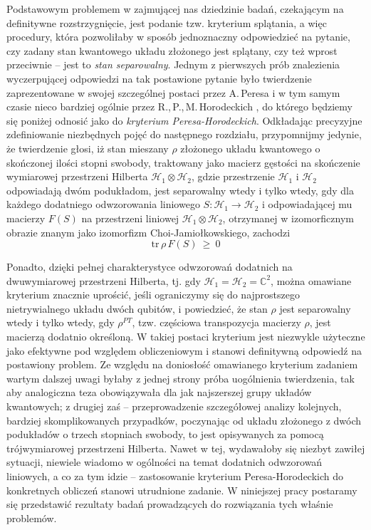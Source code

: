 Podstawowym problemem w zajmującej nas dziedzinie badań,
czekającym na definitywne rozstrzygnięcie,
jest podanie tzw. kryterium splątania,
a więc procedury,
która pozwoliłaby w sposób jednoznaczny odpowiedzieć na pytanie,
czy zadany stan kwantowego układu złożonego jest splątany,
czy też wprost przeciwnie -- jest to 
 \emph{stan separowalny}.
Jednym z pierwszych prób znalezienia wyczerpującej odpowiedzi na tak postawione
pytanie było twierdzenie zaprezentowane w swojej szczególnej postaci 
przez A.\,Peresa
\cite{peres1996separability}
i w tym samym czasie nieco bardziej ogólnie przez
R.,\,P.,\,M.\,Horodeckich
\cite{horodecki1996separability},
do którego będziemy się poniżej odnosić jako do 
 \emph{kryterium Peresa-Horodeckich}.
Odkładając precyzyjne zdefiniowanie niezbędnych pojęć do następnego rozdziału,
przypomnijmy jedynie, że twierdzenie głosi,
iż stan mieszany $\rho$ złożonego układu kwantowego o skończonej ilości
stopni swobody,
traktowany jako macierz gęstości na skończenie wymiarowej przestrzeni 
Hilberta $\mathcal{H}_{1} \otimes \mathcal{H}_{2}$,
gdzie przestrzenie $\mathcal{H}_{1}$ i $\mathcal{H}_{2}$ odpowiadają dwóm podukładom,
jest separowalny wtedy i tylko wtedy,
gdy dla każdego dodatniego odwzorowania liniowego
$S \!: \mathcal{H}_{1} \rightarrow \mathcal{H}_{2}$
i odpowiadającej mu macierzy $F(S)$ na przestrzeni liniowej
$\mathcal{H}_{1} \otimes \mathcal{H}_{2}$,
otrzymanej w izomorficznym obrazie znanym jako izomorfizm Choi-Jamiołkowskiego,
zachodzi
\begin{equation}
    \label{eq:PHcriterionOrig}
    \text{tr} \, \rho \, F(S) \: \geq \: 0
\end{equation}


Ponadto, dzięki pełnej charakterystyce odwzorowań dodatnich na dwuwymiarowej
przestrzeni Hilberta,
tj. gdy $\mathcal{H}_{1} = \mathcal{H}_{2} = \mathbb{C}^{2}$,
można omawiane kryterium znacznie uprościć,
jeśli ograniczymy się do najprostszego nietrywialnego układu dwóch qubitów,
i powiedzieć,
że stan $\rho$ jest separowalny wtedy i tylko wtedy,
gdy $\rho^{PT}$, tzw. częściowa transpozycja macierzy $\rho$,
jest macierzą dodatnio określoną.
W takiej postaci kryterium jest niezwykle użyteczne jako efektywne pod względem
obliczeniowym i stanowi definitywną odpowiedź na postawiony problem.
Ze względu na doniosłość omawianego kryterium zadaniem wartym dalszej uwagi
byłaby z jednej strony próba uogólnienia twierdzenia,
tak aby analogiczna teza obowiązywała dla jak najszerszej grupy układów kwantowych;
z drugiej zaś -- przeprowadzenie szczegółowej analizy kolejnych,
bardziej skomplikowanych przypadków,
poczynając od układu złożonego z dwóch podukładów o trzech stopniach swobody,
to jest opisywanych za pomocą trójwymiarowej przestrzeni Hilberta.
Nawet w tej,
wydawałoby się niezbyt zawiłej sytuacji,
niewiele wiadomo w ogólności na temat dodatnich odwzorowań liniowych,
a co za tym idzie -- zastosowanie kryterium Peresa-Horodeckich do konkretnych
obliczeń stanowi utrudnione zadanie.
W niniejszej pracy postaramy się przedstawić rezultaty badań prowadzących
do rozwiązania tych właśnie problemów.

